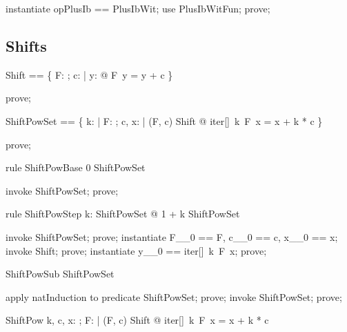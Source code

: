 \documentclass{article}
\begin{document}
\begin{zproof}
instantiate opPlusIb == PlusIbWit;
use PlusIbWitFun;
prove;
\end{zproof}

\subsection{Shifts}

\begin{zed}
  Shift == \{ F: \nat \fun \nat; c: \nat | \forall y: \nat @ F~y = y + c \}
\end{zed}

\begin{zproof}
prove;
\end{zproof}

\begin{zed}
  ShiftPowSet == \{ k: \nat | \forall F: \nat \fun \nat; c, x: \nat | (F, c) \in Shift @ iter[\nat]~k~F~x = x + k * c \}
\end{zed}

\begin{zproof}
prove;
\end{zproof}

\begin{theorem}{rule ShiftPowBase}
  0 \in ShiftPowSet
\end{theorem}

\begin{zproof}
invoke ShiftPowSet;
prove;
\end{zproof}

\begin{theorem}{rule ShiftPowStep}
  \forall k: ShiftPowSet @ 1 + k \in ShiftPowSet
\end{theorem}

\begin{zproof}
invoke ShiftPowSet;
prove;
instantiate F\_\_0 == F, c\_\_0 == c, x\_\_0 == x;
invoke Shift;
prove;
instantiate y\_\_0 == iter[\nat]~k~F~x;
prove;
\end{zproof}

\begin{theorem}{ShiftPowSub}
  \nat \subseteq ShiftPowSet
\end{theorem}

\begin{zproof}
apply natInduction to predicate \nat \subseteq ShiftPowSet;
prove;
invoke ShiftPowSet;
prove;
\end{zproof}

\begin{theorem}{ShiftPow}
  \forall k, c, x: \nat; F: \nat \fun \nat | (F, c) \in Shift @ iter[\nat]~k~F~x = x + k * c
\end{theorem}
\end{document}
